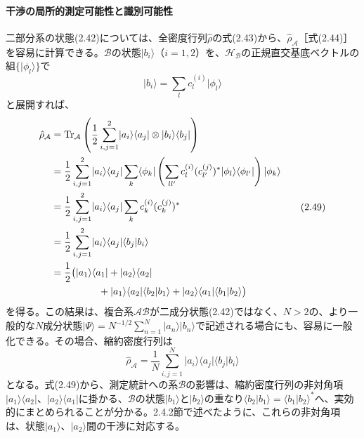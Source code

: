 \hypertarget{srcpage:47}{}\label{srcpage:47}
\paragraph{干渉の局所的測定可能性と識別可能性}
二部分系の状態(2.42)については、全密度行列$\hat\rho$の式(2.43)から、$\hat\rho_{\mathcal A}$［式(2.44)］を容易に計算できる。$\mathcal B$の状態$\lvert b_i\rangle$（$i=1,2$）を、$\mathcal H_{\mathcal B}$の正規直交基底ベクトルの組$\{\lvert\phi_l\rangle\}$で
\begin{equation}\lvert b_i\rangle=\sum_l c_l^{(i)}\lvert\phi_l\rangle\tag{2.48}\end{equation}
と展開すれば、
\begin{equation}\begin{split}
\hat\rho_{\mathcal A}&=\operatorname{Tr}_{\mathcal A}\left(\frac12\sum_{i,j=1}^2\lvert a_i\rangle\langle a_j\rvert\otimes\lvert b_i\rangle\langle b_j\rvert\right)\\
&=\frac12\sum_{i,j=1}^2\lvert a_i\rangle\langle a_j\rvert\sum_k\langle\phi_k\rvert\left(\sum_{ll'}c_l^{(i)}(c_{l'}^{(j)})^*\lvert\phi_l\rangle\langle\phi_{l'}\rvert\right)\lvert\phi_k\rangle\\
&=\frac12\sum_{i,j=1}^2\lvert a_i\rangle\langle a_j\rvert\sum_k c_k^{(i)}(c_k^{(j)})^*\\
&=\frac12\sum_{i,j=1}^2\lvert a_i\rangle\langle a_j\rvert\langle b_j\vert b_i\rangle\\
&=\frac12\bigl(\lvert a_1\rangle\langle a_1\rvert+\lvert a_2\rangle\langle a_2\rvert\\
&\hspace{17mm}+\lvert a_1\rangle\langle a_2\rvert\langle b_2\vert b_1\rangle+\lvert a_2\rangle\langle a_1\rvert\langle b_1\vert b_2\rangle\bigr)
\end{split}\tag{2.49}\end{equation}
を得る。この結果は、複合系$\mathcal{AB}$が二成分状態(2.42)ではなく、$N>2$の、より一般的な$N$成分状態$\lvert\Psi\rangle=N^{-1/2}\sum_{n=1}^N\lvert a_n\rangle\lvert b_n\rangle$で記述される場合にも、容易に一般化できる。その場合、縮約密度行列は
\begin{equation}\hat\rho_{\mathcal A}=\frac1N\sum_{i,j=1}^N\lvert a_i\rangle\langle a_j\rvert\langle b_j\vert b_i\rangle\tag{2.50}\end{equation}
となる。式(2.49)から、測定統計への系$\mathcal B$の影響は、縮約密度行列の非対角項$\lvert a_1\rangle\langle a_2\rvert$、$\lvert a_2\rangle\langle a_1\rvert$に掛かる、$\mathcal B$の状態$\lvert b_1\rangle$と$\lvert b_2\rangle$の重なり$\langle b_2\vert b_1\rangle=\langle b_1\vert b_2\rangle^*$へ、実効的にまとめられることが分かる。2.4.2節で述べたように、これらの非対角項は、状態$\lvert a_1\rangle$、$\lvert a_2\rangle$間の干渉に対応する。

